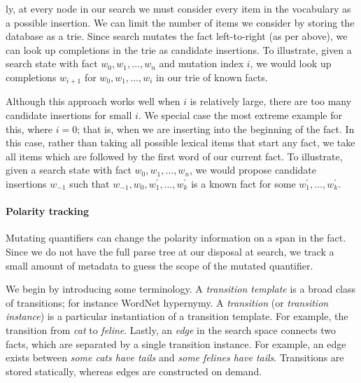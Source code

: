 \Naive ly, at every node in our search we must consider every item in
  the vocabulary as a possible insertion.
We can limit the number of items we consider by storing the database
  as a trie.
Since search mutates the fact left-to-right (as per above), we can
  look up completions in the trie as candidate insertions.
To illustrate, given a search state with fact $w_0,w_1,\dots,w_n$
  and mutation index $i$, we would look up completions $w_{i+1}$ for
  $w_0,w_1,\dots,w_i$ in our trie of known facts.

Although this approach works well when $i$ is relatively large, there
  are too many candidate insertions for small $i$.
We special case the most extreme example for this, where $i=0$; that is, 
  when we are inserting into the beginning of the fact.
In this case, rather than taking all possible lexical items that start
  any fact, we take all items which are followed by the first word of
  our current fact.
To illustrate, given a search state with fact $w_0,w_1,\dots,w_n$,
  we would propose candidate insertions $w_{-1}$ such that
  $w_{-1},w_0,w^\prime_1,\dots,w^\prime_k$ is a known fact
  for some $w^\prime_1,\dots,w^\prime_k$.
  
%

\paragraph{Polarity tracking}
Mutating quantifiers can change the polarity information on a span
  in the fact.
Since we do not have the full parse tree at our disposal at search,
  we track a small amount of metadata to guess the scope of the
  mutated quantifier.

%
%
We begin by introducing some terminology.
A \textit{transition template} is a broad class of transitions; for
  instance WordNet hypernymy.
A \textit{transition} (or \textit{transition instance}) is a particular
  instantiation of a transition template.
For example, the transition from \textit{cat} to \textit{feline}.
Lastly, an \textit{edge} in the search space connects two facts, which
  are separated by a single transition instance.
For example, an edge exists between 
  \textit{some cats have tails} and \textit{some felines have tails}.
Transitions are stored statically, whereas edges are constructed
  on demand.


